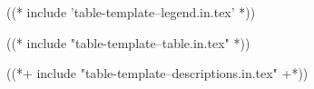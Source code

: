 \begin{frame}
\vspace*{-1\baselineskip}

((* include 'table-template--legend.in.tex' *))

((* include "table-template--table.in.tex" *))

\end{frame}

\begin{frame}[allowframebreaks]
\begin{itemize}
    \ifdefined\tightlist\tightlist\fi%
    ((*+ include "table-template--descriptions.in.tex" +*))
\end{itemize}
\end{frame}